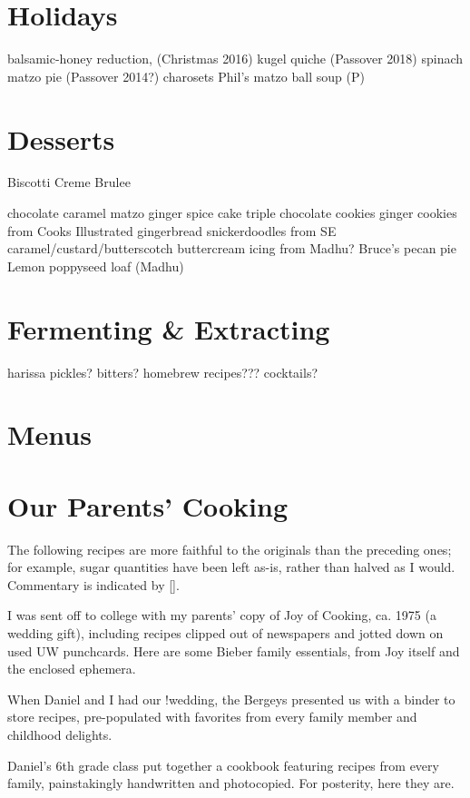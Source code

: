 \documentclass{article}
\begin{document}
\section{Holidays}





balsamic-honey reduction, (Christmas 2016)
kugel quiche (Passover 2018)
spinach matzo pie (Passover 2014?)
charosets
Phil’s matzo ball soup (P)

\section{Desserts}
Biscotti
Creme Brulee


chocolate caramel matzo
ginger spice cake
triple chocolate cookies
ginger cookies from Cooks Illustrated
gingerbread
snickerdoodles from SE
caramel/custard/butterscotch
buttercream icing from Madhu?
Bruce's pecan pie
Lemon poppyseed loaf (Madhu)

\section{Fermenting \& Extracting}
harissa
pickles?
bitters?
homebrew recipes??? cocktails?

\section{Menus}


\section{Our Parents' Cooking}
The following recipes are more faithful to the originals than the preceding ones; for example, sugar quantities have been left as-is, rather than halved as I would. Commentary is indicated by [].

I was sent off to college with my parents' copy of Joy of Cooking, ca. 1975 (a wedding gift), including recipes clipped out of newspapers and jotted down on used UW punchcards. Here are some Bieber family essentials, from Joy itself and the enclosed ephemera.


When Daniel and I had our !wedding, the Bergeys presented us with a binder to store recipes, pre-populated with favorites from every family member and childhood delights.
% 

Daniel's 6th grade class put together a cookbook featuring recipes from every family, painstakingly handwritten and photocopied. For posterity, here they are.
% 

\printindex
\end{document}
